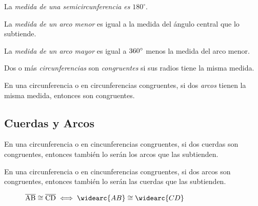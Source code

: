 \begin{definition}
    La \textit{medida de una semicircunferencia es} $180^{\circ}$.
\end{definition}

\begin{definition}
    La \textit{medida de un arco menor} es igual a la medida del ángulo central que lo subtiende.
\end{definition}

\begin{definition}
    La \textit{medida de un arco mayor} es igual a $360^{\circ}$ menos la medida del arco menor.
\end{definition}


\begin{definition}
    Dos o más \textit{circunferencias} son \textit{congruentes} si sus radios tiene la misma medida.
\end{definition}

\begin{definition}
    En una circunferencia o en circunferencias congruentes, si dos \textit{arcos} tienen la misma medida, entonces son congruentes.
\end{definition}

\clearpage

\subsection{Cuerdas y Arcos}

\begin{theorem}
    En una circunferencia o en cincunferencias congruentes, si dos cuerdas son congruentes, entonces también lo serán los arcos que las subtienden.
\end{theorem}

\begin{theorem}
    En una circunferencia o en cincunferencias congruentes, si dos arcos son congruentes, entonces también lo serán las cuerdas que las subtienden.
\end{theorem}

\begin{figure}[!h]
    \centering
    
    \caption{$\seg{AB} \cong \seg{CD} \iff \widearc{AB} \cong \widearc{CD}$}
    \label{fig:congruent-arcs-cords}
\end{figure}

